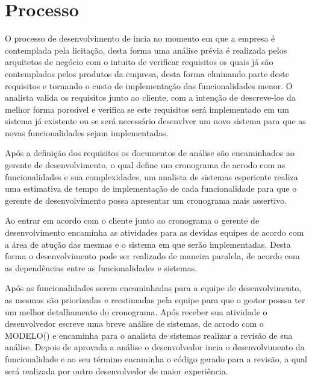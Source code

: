 \documentclass[	DIV=calc,%
							paper=a4,%
							fontsize=12pt,%
							onecolumn]{scrartcl}	 					%
\begin{document}
\section{Processo}

O processo de desenvolvimento de incia no momento em que a empresa é contemplada pela licitação, desta forma uma análise prévia é realizada pelos arquitetos
de negócio com o intuito de verificar requisitos os quais já são contemplados pelos produtos da empresa, desta forma elminando parte deste requisitos e tornando o
custo de implementação das funcionalidades menor. O analista valida os requisitos junto ao cliente, com a intenção de descreve-los da melhor forma porssível e verifica
se este requisitos será implementado em um sistema já existente ou se será necessário desenvlver um novo sistema para que as novas funcionalidades sejam implementadas.

Após a definição dos requisitos os documentos de análise são encaminhados ao gerente de desenvolvimento, o qual define um cronograma de acrodo com as funcionalidades e
sua complexidades, um analista de sistemas esperiente realiza uma estimativa de tempo de implementação de cada funcionalidade para que o gerente de desenvolvimento possa
apresentar um cronograma mais assertivo.

Ao entrar em acordo com o cliente junto ao cronograma o gerente de desenvolvimento encaminha as atividades para as devidas equipes de acordo com a área de atução das mesmas
e o sistema em que serão implementadas. Desta forma o desenvolvimento pode ser realizado de maneira paralela, de acordo com as dependências entre as funcionalidades e sistemas.

Após as funcionalidades serem encaminhadas para a equipe de desenvolvimento, as mesmas são priorizadas e reestimadas pela equipe para que o gestor posssa ter um melhor
detalhamento do cronograma. Após receber sua atividade o desenvolvedor escreve uma breve análise de sistemas, de acrodo com o MODELO() e encaminha para o analista de sistemas
realizar a revisão de sua análise. Depois de aprovada a análise o desenvolvedor incia o desenvolvimento da funcionalidade e ao seu término encaminha o código gerado para
a revisão, a qual será realizada por outro desenvolvedor de maior experiência.
\end{document}
